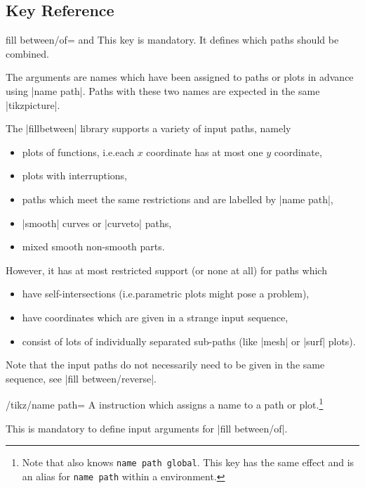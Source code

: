 \subsection{Key Reference}

\begin{tikzkey}{fill between/of= and }
    This key is mandatory. It defines which paths should be combined.

    The arguments are names which have been assigned to paths or plots in
    advance using |name path|. Paths with these two names are expected in the
    same |tikzpicture|.

    The |fillbetween| library supports a variety of input paths, namely
    \begin{itemize}
        \item plots of functions, i.e.\@ each $x$ coordinate has at most one
            $y$ coordinate,
        \item plots with interruptions,
        \item \Tikz{} paths which meet the same restrictions and are labelled
            by |name path|,
        \item |smooth| curves or |curveto| paths,
        \item mixed smooth non-smooth parts.
    \end{itemize}
    However, it has at most restricted support (or none at all) for paths which
    \begin{itemize}
        \item have self-intersections (i.e.\@ parametric plots might pose a
            problem),
        \item have coordinates which are given in a strange input sequence,
        \item consist of lots of individually separated sub-paths (like
            |mesh| or |surf| plots).
    \end{itemize}

    Note that the input paths do not necessarily need to be given in the same
    sequence, see |fill between/reverse|.
\end{tikzkey}

\begin{key}{/tikz/name path=}
    A \Tikz{} instruction which assigns a name to a path or plot.\footnote{Note
    that \tikzname{} also knows \texttt{name path global}. This key has the
    same effect and is an alias for \texttt{name path} within a \PGFPlots{}
    environment.}

    This is mandatory to define input arguments for |fill between/of|.
\end{key}

